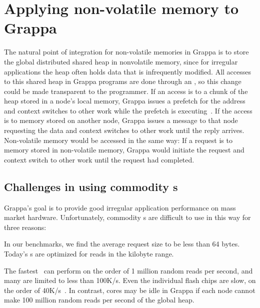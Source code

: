 \section{Applying non-volatile memory to Grappa}
The natural point of integration for non-volatile memories in Grappa
is to store the global distributed shared heap in nonvolatile memory, since for irregular applications the heap
often holds data that is infrequently modified. All accesses to
this shared heap in Grappa programs are done through an , so this change could be made transparent to the programmer. 
If an 
access is to a chunk of the heap stored in a node's local memory, Grappa issues a prefetch for the address
and context switches to other work while the prefetch is executing~\cite{Nelson:hotpar2011}. If
the access is to memory stored on another node, Grappa issues a
message to that node requesting the data and context switches to other
work until the reply arrives. Non-volatile memory would be accessed in
the same way: If a request is to memory stored in non-volatile memory,
Grappa would initiate the request and context switch to other work
until the request had completed.

\subsection{Challenges in using commodity \hspace{0.75pt}s}
Grappa's goal is to provide good irregular application performance on
mass market hardware. Unfortunately, commodity \hspace{0.75pt}s are
difficult to use in this way for three reasons:

 In our benchmarks, we find the average request size to be
less than 64 bytes. Today's \hspace{0.75pt}s are optimized for reads in the
kilobyte range.  

 The fastest~\cite{fusionio} can
perform on the order of 1 million random reads per second, and many
are limited to less than 100K/s. Even the individual flash chips are slow, on the order of 40K/s~\cite{micronFlash}. In contrast, cores may be idle in
Grappa if each node cannot make 100 million random reads per second of
the global heap. 

